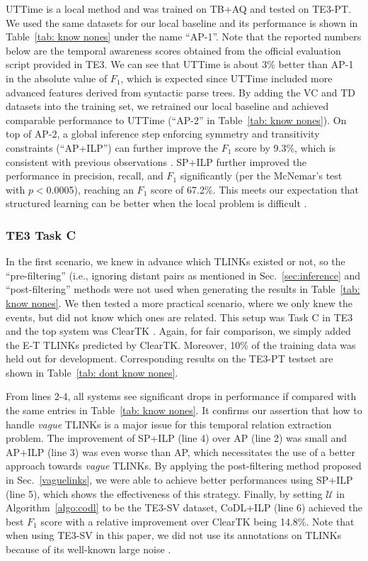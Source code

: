 \documentclass[11pt,letterpaper]{article}
\newcommand{\final}[1]{#1}
\begin{document}
{UTTime is a local method and was trained on TB+AQ and tested on TE3-PT. We used the same datasets for our local baseline and its performance is shown in Table~\ref{tab: know nones} under the name ``AP-1''. Note that the reported numbers below are the temporal awareness scores obtained from the official evaluation script provided in TE3. We can see that UTTime is about 3\% better than AP-1 in the absolute value of $F_1$, which is expected since UTTime included more advanced features derived from syntactic parse trees.
By adding the VC and TD datasets into the training set, we retrained our local baseline and achieved comparable performance to UTTime (``AP-2'' in Table~\ref{tab: know nones}). On top of AP-2, a global inference step enforcing symmetry and transitivity constraints (``AP+ILP'') can further improve the $F_1$ score by 9.3\%, which is consistent with previous observations \citep{ChambersJu08, DoLuRo12}. SP+ILP further improved the performance in precision, recall, and $F_1$ significantly (per the McNemar's test \citep{everitt1992analysis,dietterich1998approximate} with $p<$0.0005), reaching an $F_1$ score of 67.2\%. This meets our expectation that structured learning can be better when the local problem is difficult \citep{PRYZ05}. 


\subsubsection{\final{TE3 Task C}}
In the first scenario, we knew in advance which TLINKs existed or not, so the ``pre-filtering'' (i.e., ignoring distant pairs as mentioned in Sec.~\ref{sec:inference} and ``post-filtering'' methods were not used when generating \final{the results in} Table~\ref{tab: know nones}.
We then tested a more practical scenario, where we only knew the events, but did not know which ones are related.
This setup was Task C in TE3 and the top system was ClearTK \citep{bethard2013cleartk}. Again, for fair comparison, we simply added the E-T TLINKs predicted by ClearTK. Moreover, 10\% of the training data was held out for development. Corresponding results on the TE3-PT testset are shown in Table~\ref{tab: dont know nones}.

From lines 2-4, all systems see significant drops in performance if compared with the same entries in Table~\ref{tab: know nones}. It confirms our assertion that how to handle {\em vague} TLINKs is a major issue for this temporal relation extraction problem.
The improvement of SP+ILP (line 4) over AP (line 2) was small and AP+ILP (line 3) was even worse than AP, which necessitates the use of a better approach towards {\em vague} TLINKs.
By applying the post-filtering method proposed in Sec.~\ref{vaguelinks}, we were able to achieve better performances using SP+ILP (line 5), which shows the effectiveness of this strategy.
Finally, by setting $\mathcal{U}$ in Algorithm~\ref{algo:codl} to be the TE3-SV dataset, CoDL+ILP (line 6) achieved the best $F_1$ score with a relative improvement over ClearTK being 14.8\%.
Note that when using TE3-SV in this paper, we did not use its annotations on TLINKs because of its well-known large noise \citep{uzzaman2013TE3}.

}
\end{document}
